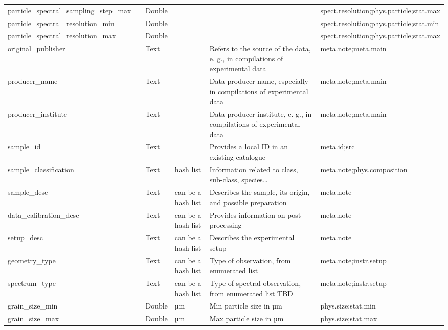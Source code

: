 \documentclass[11pt,a4paper]{ivoa}
\begin{document}
\begin{longtable}{p{3.5cm}p{0.5cm}p{1cm}p{1cm}p{7cm}p{3cm}}
particle\_spectral\_sampling\_step\_max&&Double&&&spect.resolution;phys.particle;stat.max \\

particle\_spectral\_resolution\_min&&Double&&&spect.resolution;phys.particle;stat.min \\

particle\_spectral\_resolution\_max&&Double&&&spect.resolution;phys.particle;stat.max \\

original\_publisher&&Text&&Refers to the source of the data, e. g.,  in compilations of experimental data&meta.note;meta.main\\

producer\_name&&Text&&Data producer name, especially in compilations of experimental data&meta.note;meta.main\\

producer\_institute&&Text&&Data producer institute, e. g., in compilations of experimental data&meta.note;meta.main\\

sample\_id&&Text&&Provides a local ID in an existing catalogue &meta.id;src\\

sample\_classification&&Text&hash list&Information related to class, sub-class, species… &meta.note;phys.composition\\

sample\_desc&&Text&can be a hash list&Describes the sample, its origin, and possible preparation&meta.note\\

data\_calibration\_desc&&Text&can be a hash list&Provides information on post-processing &meta.note\\

setup\_desc&&Text&can be a hash list&Describes the experimental setup &meta.note\\

geometry\_type&&Text&can be a hash list&Type of observation, from enumerated list&meta.note;instr.setup\\

spectrum\_type&&Text&can be a hash list&Type of spectral observation, from enumerated list TBD&meta.note;instr.setup\\

grain\_size\_min&&Double&µm&Min particle size in µm&phys.size;stat.min\\

grain\_size\_max&&Double&µm&Max particle size in µm&phys.size;stat.max\\


\end{longtable}
\end{document}
